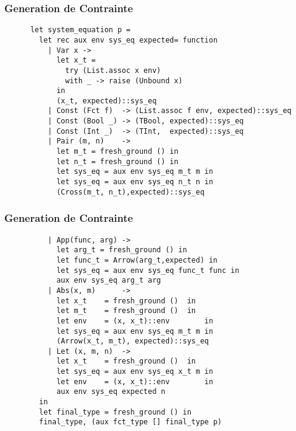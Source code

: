 \documentclass{beamer}
\begin{document}
\begin{frame}[fragile]
  \frametitle{Generation de Contrainte}
  \begin{mdframed}[roundcorner=20pt,backgroundcolor=gray!50]
    \begin{lstlisting}
      let system_equation p =
        let rec aux env sys_eq expected= function
          | Var x ->
            let x_t =
              try (List.assoc x env)
              with _ -> raise (Unbound x)
            in
            (x_t, expected)::sys_eq
          | Const (Fct f)  -> (List.assoc f env, expected)::sys_eq
          | Const (Bool _) -> (TBool, expected)::sys_eq
          | Const (Int _)  -> (TInt,  expected)::sys_eq
          | Pair (m, n)    ->
            let m_t = fresh_ground () in
            let n_t = fresh_ground () in
            let sys_eq = aux env sys_eq m_t m in
            let sys_eq = aux env sys_eq n_t n in
            (Cross(m_t, n_t),expected)::sys_eq

    \end{lstlisting}
  \end{mdframed}
\end{frame} 

\begin{frame}[fragile]
  \frametitle{Generation de Contrainte}
  \begin{mdframed}[roundcorner=20pt,backgroundcolor=gray!50]
    \begin{lstlisting}
          | App(func, arg) ->
            let arg_t = fresh_ground () in
            let func_t = Arrow(arg_t,expected) in
            let sys_eq = aux env sys_eq func_t func in
            aux env sys_eq arg_t arg
          | Abs(x, m)      ->
            let x_t    = fresh_ground ()  in
            let m_t    = fresh_ground ()  in
            let env    = (x, x_t)::env        in
            let sys_eq = aux env sys_eq m_t m in
            (Arrow(x_t, m_t), expected)::sys_eq
          | Let (x, m, n)  ->
            let x_t    = fresh_ground ()  in
            let sys_eq = aux env sys_eq x_t m in
            let env    = (x, x_t)::env        in
            aux env sys_eq expected n
        in
        let final_type = fresh_ground () in
        final_type, (aux fct_type [] final_type p)
    \end{lstlisting}
  \end{mdframed}
\end{frame} 
\end{document}
